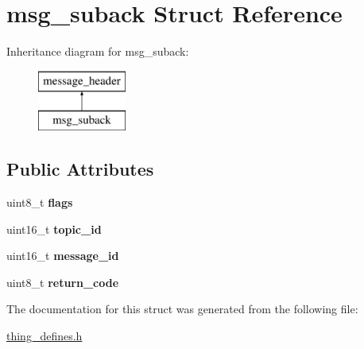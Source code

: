 \hypertarget{structmsg__suback}{\section{msg\-\_\-suback Struct Reference}
\label{structmsg__suback}
}
Inheritance diagram for msg\-\_\-suback\-:\begin{figure}[H]
\begin{center}
\leavevmode
\includegraphics[height=2.000000cm]{structmsg__suback}
\end{center}
\end{figure}
\subsection*{Public Attributes}
\begin{DoxyCompactItemize}
\item 
\hypertarget{structmsg__suback_ad36871bff8bdd84269560fef37072764}{uint8\-\_\-t {\bfseries flags}}\label{structmsg__suback_ad36871bff8bdd84269560fef37072764}

\item 
\hypertarget{structmsg__suback_ac9a614ff568ce6e7ef7cd59d8700f7ca}{uint16\-\_\-t {\bfseries topic\-\_\-id}}\label{structmsg__suback_ac9a614ff568ce6e7ef7cd59d8700f7ca}

\item 
\hypertarget{structmsg__suback_ad8420b6b42af00251b95518bf42771dd}{uint16\-\_\-t {\bfseries message\-\_\-id}}\label{structmsg__suback_ad8420b6b42af00251b95518bf42771dd}

\item 
\hypertarget{structmsg__suback_a8896e294abd8a05e37151965fed1e794}{uint8\-\_\-t {\bfseries return\-\_\-code}}\label{structmsg__suback_a8896e294abd8a05e37151965fed1e794}

\end{DoxyCompactItemize}


The documentation for this struct was generated from the following file\-:\begin{DoxyCompactItemize}
\item 
\hyperlink{thing__defines_8h}{thing\-\_\-defines.\-h}\end{DoxyCompactItemize}
